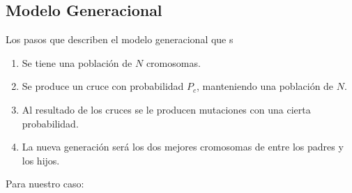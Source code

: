 
\subsection{Modelo Generacional}  

Los pasos que describen el modelo generacional que s
\begin{enumerate}
    \item Se tiene una población de $N$ cromosomas. 
    \item Se produce un cruce con probabilidad $P_c$, manteniendo una población de $N$.
    \item Al resultado de los cruces se le producen mutaciones con una cierta probabilidad. 
    \item La nueva generación será los dos mejores cromosomas de entre los padres y los hijos. 
\end{enumerate}


Para nuestro caso: 
